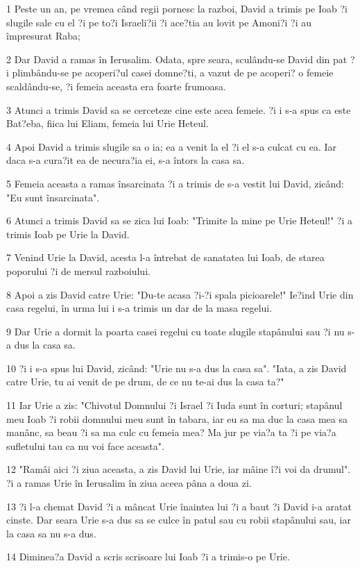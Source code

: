 \par 1 Peste un an, pe vremea când regii pornesc la razboi, David a trimis pe Ioab ?i slugile sale cu el ?i pe to?i Israeli?ii ?i ace?tia au lovit pe Amoni?i ?i au împresurat Raba;
\par 2 Dar David a ramas în Ierusalim. Odata, spre seara, sculându-se David din pat ?i plimbându-se pe acoperi?ul casei domne?ti, a vazut de pe acoperi? o femeie scaldându-se, ?i femeia aceasta era foarte frumoasa.
\par 3 Atunci a trimis David sa se cerceteze cine este acea femeie. ?i i s-a spus ca este Bat?eba, fiica lui Eliam, femeia lui Urie Heteul.
\par 4 Apoi David a trimis slugile sa o ia; ea a venit la el ?i el s-a culcat cu ea. Iar daca s-a cura?it ea de necura?ia ei, s-a întors la casa sa.
\par 5 Femeia aceasta a ramas însarcinata ?i a trimis de s-a vestit lui David, zicând: "Eu sunt însarcinata".
\par 6 Atunci a trimis David sa se zica lui Ioab: "Trimite la mine pe Urie Heteul!" ?i a trimis Ioab pe Urie la David.
\par 7 Venind Urie la David, acesta l-a întrebat de sanatatea lui Ioab, de starea poporului ?i de mersul razboiului.
\par 8 Apoi a zis David catre Urie: "Du-te acasa ?i-?i spala picioarele!" Ie?ind Urie din casa regelui, în urma lui i s-a trimis un dar de la masa regelui.
\par 9 Dar Urie a dormit la poarta casei regelui cu toate slugile stapânului sau ?i nu s-a dus la casa sa.
\par 10 ?i i s-a spus lui David, zicând: "Urie nu s-a dus la casa sa". "Iata, a zis David catre Urie, tu ai venit de pe drum, de ce nu te-ai dus la casa ta?"
\par 11 Iar Urie a zis: "Chivotul Domnului ?i Israel ?i Iuda sunt în corturi; stapânul meu Ioab ?i robii domnului meu sunt în tabara, iar eu sa ma duc la casa mea sa manânc, sa beau ?i sa ma culc cu femeia mea? Ma jur pe via?a ta ?i pe via?a sufletului tau ca nu voi face aceasta".
\par 12 "Ramâi aici ?i ziua aceasta, a zis David lui Urie, iar mâine î?i voi da drumul". ?i a ramas Urie în Ierusalim în ziua aceea pâna a doua zi.
\par 13 ?i l-a chemat David ?i a mâncat Urie înaintea lui ?i a baut ?i David i-a aratat cinste. Dar seara Urie s-a dus sa se culce în patul sau cu robii stapânului sau, iar la casa sa nu s-a dus.
\par 14 Diminea?a David a scris scrisoare lui Ioab ?i a trimis-o pe Urie.
